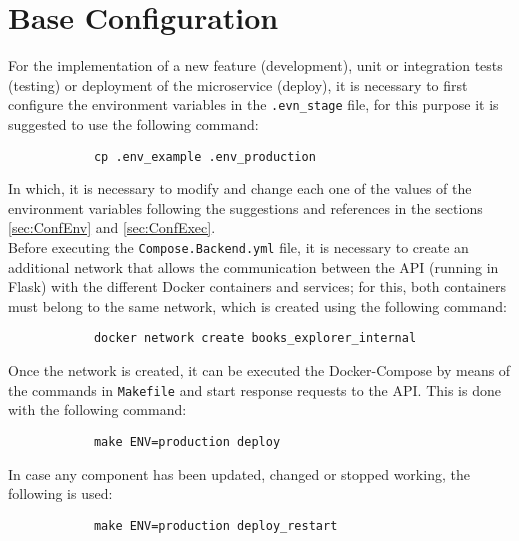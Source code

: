 \documentclass[12pt,a4paper]{article}
\begin{document}
    \newpage

    \section{Base Configuration}\label{sec:Base}
    {
        For the implementation of a new feature (development), unit or integration tests 
        (testing) or deployment of the microservice (deploy), it is necessary to first 
        configure the environment variables in the \verb*|.evn_stage| file, for this 
        purpose it is suggested to use the following command:

        \begin{verbatim}
            cp .env_example .env_production
        \end{verbatim}

        In which, it is necessary to modify and change each one of the values of the 
        environment variables following the suggestions and references in the sections 
        \ref{sec:ConfEnv} and \ref{sec:ConfExec}.\\

        Before executing the \verb*|Compose.Backend.yml| file, it is necessary to create 
        an additional network that allows the communication between the API (running in 
        Flask) with the different Docker containers and services; for this, both containers 
        must belong to the same network, which is created using the following command:

        \begin{verbatim}
            docker network create books_explorer_internal
        \end{verbatim}

        Once the network is created, it can be executed the Docker-Compose by means of the 
        commands in \verb*|Makefile| and start response requests to the API. This is done 
        with the following command:

        \begin{verbatim}
            make ENV=production deploy
        \end{verbatim}

        In case any component has been updated, changed or stopped working, the following 
        is used:

        \begin{verbatim}
            make ENV=production deploy_restart
        \end{verbatim}
    }
\end{document}
